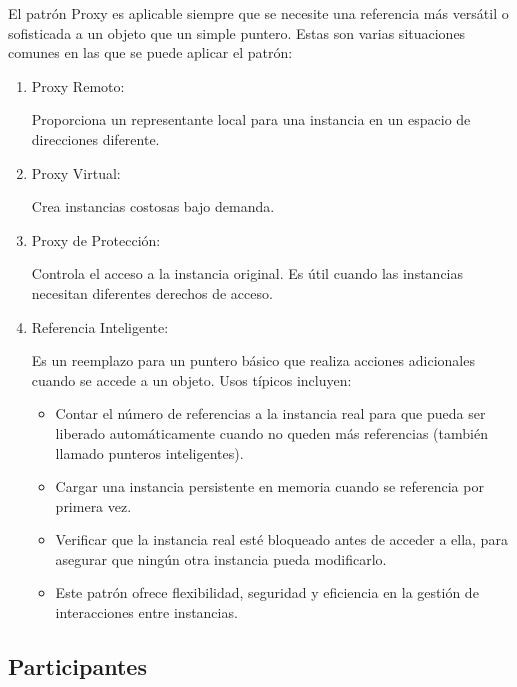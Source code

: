 El patrón Proxy es aplicable siempre que se necesite una referencia más versátil o sofisticada a un objeto que un simple puntero. Estas son varias situaciones comunes en las que se puede aplicar el patrón:

\begin{enumerate}
\item Proxy Remoto:

Proporciona un representante local para una instancia en un espacio de direcciones diferente.

\item Proxy Virtual:

Crea instancias costosas bajo demanda.

\item Proxy de Protección:

Controla el acceso a la instancia original.
Es útil cuando las instancias necesitan diferentes derechos de acceso.

\item Referencia Inteligente:

Es un reemplazo para un puntero básico que realiza acciones adicionales cuando se accede a un objeto.
Usos típicos incluyen:

\begin{itemize}
\item Contar el número de referencias a la instancia real para que pueda ser liberado automáticamente cuando no queden más referencias (también llamado punteros inteligentes).
\item Cargar una instancia persistente en memoria cuando se referencia por primera vez.
\item Verificar que la instancia real esté bloqueado antes de acceder a ella, para asegurar que ningún otra instancia pueda modificarlo.
\item 
Este patrón ofrece flexibilidad, seguridad y eficiencia en la gestión de interacciones entre instancias.
\end{itemize}

\end{enumerate}


\subsection*{Participantes}

